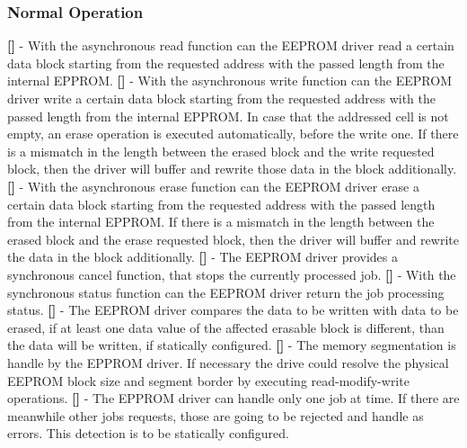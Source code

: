 \subsubsection{Normal Operation}
{\bf []} - With the asynchronous read function can the EEPROM driver read a certain data block starting from the requested address with the passed length from the internal \mbox{EPPROM}.\newline
\newline
{\bf []} - With the asynchronous write function can the EEPROM driver write a certain data block starting from the requested address with the passed length from the internal \mbox{EPPROM}. In case that the addressed cell is not empty, an erase operation is executed automatically, before the write one. If there is a mismatch in the length between the erased block and the write requested block, then the driver will buffer and rewrite those data in the block additionally.\newline
\newline
{\bf []} - With the asynchronous erase function can the EEPROM driver erase a certain data block starting from the requested address with the passed length from the internal \mbox{EPPROM}. If there is a mismatch in the length between the erased block and the erase requested block, then the driver will buffer and rewrite the data in the block additionally.\newline
\newline
{\bf []} - The EEPROM driver provides a synchronous cancel function, that stops the currently processed job.\newline
\newline
{\bf []} - With the synchronous status function can the EEPROM driver return the job processing status.\newline
\newline
{\bf []} - The EEPROM driver compares the data to be written with data to be erased, if at least one data value of the affected erasable block is different, than the data will be written, if statically configured.\newline
\newline
{\bf []} - The memory segmentation is handle by the EPPROM driver. If necessary the drive could resolve the physical \mbox{EEPROM} block size and segment border by executing read-modify-write operations.\newline
\newline
{\bf []} - The EPPROM driver can handle only one job at time. If there are meanwhile other jobs requests, those are going to be rejected and handle as errors. This detection is to be statically configured.\newline
